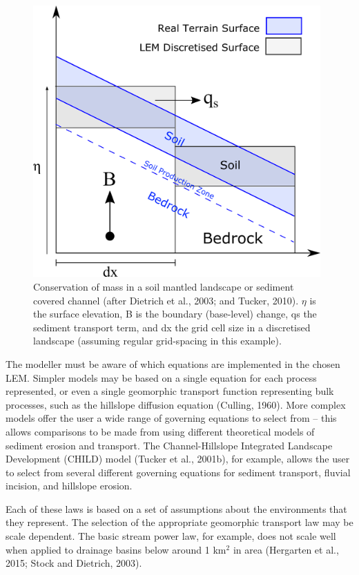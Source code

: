 \begin{figure}[t]
\includegraphics[width=11cm]{LEMFinalRevisedmanuscriptDAVFinalrevisions-img/LEMFinalRevisedmanuscriptDAVFinalrevisions-img003.png} 
\caption{Conservation of mass in a soil mantled landscape or sediment covered channel (after Dietrich et al., 2003; and Tucker, 2010). $\eta $ is the surface elevation, B is the boundary (base-level) change, qs the sediment transport term, and dx the grid cell size in a discretised landscape (assuming regular grid-spacing in this example).}
\label{fig_conservation_mass}
\end{figure}

The modeller must be aware of which equations are implemented in the chosen LEM. Simpler models may be based on a single equation for each process represented, or even a single geomorphic transport function representing bulk processes, such as the hillslope diffusion equation (Culling, 1960). More complex models offer the user a wide range of governing equations to select from – this allows comparisons to be made from using different theoretical models of sediment erosion and transport. The Channel-Hillslope Integrated Landscape Development (CHILD) model (Tucker et al., 2001b), for example, allows the user to select from several different governing equations for sediment transport, fluvial incision, and hillslope erosion.  

Each of these laws is based on a set of assumptions about the environments that they represent. The selection of the appropriate geomorphic transport law may be scale dependent. The basic stream power law, for example, does not scale well when applied to drainage basins below around 1 km\(^2\) in area (Hergarten et al., 2015; Stock and Dietrich, 2003).

